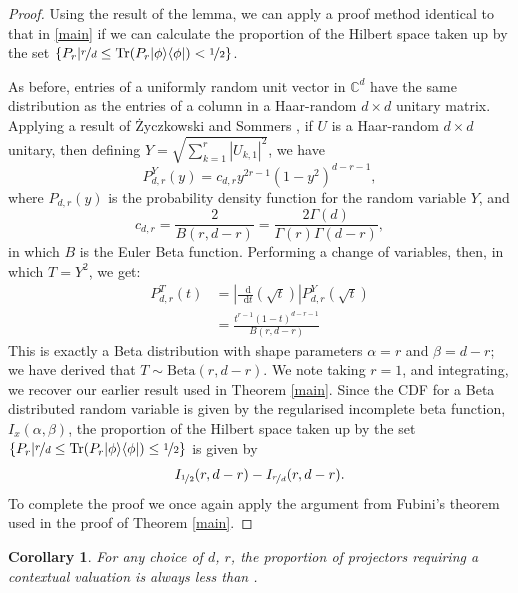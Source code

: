 \documentclass{amsart}
\newtheorem{cor}{Corollary}
\theoremstyle{definition}
\DeclareMathOperator{\tr}{Tr}
\newcommand{\ketbra}[1]{{\left\vert {#1}\middle\rangle\middle\langle{#1}\right\vert}}
\newcommand*\dif{\mathop{}\!\mathrm{d}}
\begin{document}
\begin{proof}
Using the result of the lemma, we can apply a proof method identical to that in \ref{main} if we can calculate the proportion of the Hilbert space taken up by the set $\left\{P_r\middle|\nicefrac{r}{d}\leq \tr(P_r\ketbra{\phi})<\nicefrac12\right\}$.

As before, entries of a uniformly random unit vector in $\mathbb{C}^d$ have the same distribution as the entries of a column in a Haar-random $d\times d$ unitary matrix. Applying a result of \.{Z}yczkowski and Sommers \cite{Zycz2000}, if $U$ is a Haar-random $d\times d$ unitary, then defining $Y=\sqrt{\sum_{k=1}^r\left|U_{k,1}\right|^2}$, we have
\begin{equation}
P^Y_{d,r}(y)=c_{d,r}y^{2r-1}(1-y^2)^{d-r-1},
\end{equation}
where $P_{d,r}(y)$ is the probability density function for the random variable $Y$, and
\begin{equation}
c_{d,r}=\frac{2}{B\left(r,d-r\right)}=\frac{2\Gamma(d)}{\Gamma(r)\Gamma(d-r)},
\end{equation}
in which $B$ is the Euler Beta function. Performing a change of variables, then, in which $T=Y^2$, we get: 
\begin{align}
P^T_{d,r}(t)&=\left|\frac{\dif}{\dif t}\left(\sqrt{t}\right)\right|P^Y_{d,r}\left(\sqrt{t}\right)\\
&=\frac{t^{r-1}\left(1-t\right)^{d-r-1}}{B(r,d-r)}
\end{align}
This is exactly a Beta distribution with shape parameters $\alpha=r$ and $\beta=d-r$; we have derived that $T\sim\mbox{Beta}(r,d-r)$. We note taking $r=1$, and integrating, we recover our earlier result used in Theorem \ref{main}. Since the CDF for a Beta distributed random variable is given by the regularised incomplete beta function, $I_x(\alpha,\beta)$, the proportion of the Hilbert space taken up by the set $\left\{P_r\middle|\nicefrac{r}{d}\leq \tr(P_r\ketbra{\phi})\leq\nicefrac12\right\}$ is given by
\begin{equation}
I_{\nicefrac{1}{2}}(r,d-r)-I_{\nicefrac{r}{d}}(r,d-r).
\end{equation}
To complete the proof we once again apply the argument from Fubini's theorem used in the proof of Theorem \ref{main}.
\end{proof}
\begin{cor}
For any choice of $d$, $r$, the proportion of projectors requiring a contextual valuation is always less than .
\end{cor}
\end{document}
